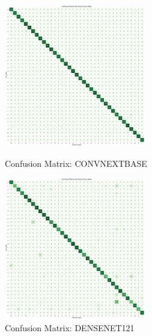 \begin{figure}[h!]
    \centering
    \includegraphics[width=0.55\textwidth]{Assets/confusion_matrix/CONVNEXTBASE.png}
    \caption{Confusion Matrix: CONVNEXTBASE}
    \vspace{1.5cm} %
    \includegraphics[width=0.55\textwidth]{Assets/confusion_matrix/DENSENET121.png}
    \caption{Confusion Matrix: DENSENET121}
\end{figure}

\newpage


